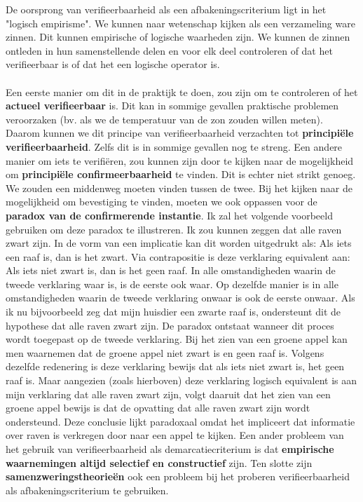 \documentclass[../summary.tex]{subfiles}
\begin{document}
	De oorsprong van verifieerbaarheid als een afbakeningscriterium ligt in het "logisch empirisme". We kunnen naar wetenschap kijken als een verzameling ware zinnen. Dit kunnen empirische of logische waarheden zijn. We kunnen de zinnen ontleden in hun samenstellende delen en voor elk deel controleren of dat het verifieerbaar is of dat het een logische operator is.
	\\\\
	Een eerste manier om dit in de praktijk te doen, zou zijn om te controleren of het \textbf{actueel verifieerbaar} is. Dit kan in sommige gevallen praktische problemen veroorzaken (bv. als we de temperatuur van de zon zouden willen meten). Daarom kunnen we dit principe van verifieerbaarheid verzachten tot \textbf{principiële verifieerbaarheid}. Zelfs dit is in sommige gevallen nog te streng. Een andere manier om iets te verifiëren, zou kunnen zijn door te kijken naar de mogelijkheid om \textbf{principiële confirmeerbaarheid} te vinden. Dit is echter niet strikt genoeg. We zouden een middenweg moeten vinden tussen de twee. Bij het kijken naar de mogelijkheid om bevestiging te vinden, moeten we ook oppassen voor de \textbf{paradox van de confirmerende instantie}. Ik zal het volgende voorbeeld gebruiken om deze paradox te illustreren. Ik zou kunnen zeggen dat alle raven zwart zijn. In de vorm van een implicatie kan dit worden uitgedrukt als: Als iets een raaf is, dan is het zwart. Via contrapositie is deze verklaring equivalent aan: Als iets niet zwart is, dan is het geen raaf. In alle omstandigheden waarin de tweede verklaring waar is, is de eerste ook waar. Op dezelfde manier is in alle omstandigheden waarin de tweede verklaring onwaar is ook de eerste onwaar. Als ik nu bijvoorbeeld zeg dat mijn huisdier een zwarte raaf is, ondersteunt dit de hypothese dat alle raven zwart zijn. De paradox ontstaat wanneer dit proces wordt toegepast op de tweede verklaring. Bij het zien van een groene appel kan men waarnemen dat de groene appel niet zwart is en geen raaf is. Volgens dezelfde redenering is deze verklaring bewijs dat als iets niet zwart is, het geen raaf is. Maar aangezien (zoals hierboven) deze verklaring logisch equivalent is aan mijn verklaring dat alle raven zwart zijn, volgt daaruit dat het zien van een groene appel bewijs is dat de opvatting dat alle raven zwart zijn wordt ondersteund. Deze conclusie lijkt paradoxaal omdat het impliceert dat informatie over raven is verkregen door naar een appel te kijken. Een ander probleem van het gebruik van verifieerbaarheid als demarcatiecriterium is dat \textbf{empirische waarnemingen altijd selectief en constructief} zijn. Ten slotte zijn \textbf{samenzweringstheorieën} ook een probleem bij het proberen verifieerbaarheid als afbakeningscriterium te gebruiken.
	
\end{document}
